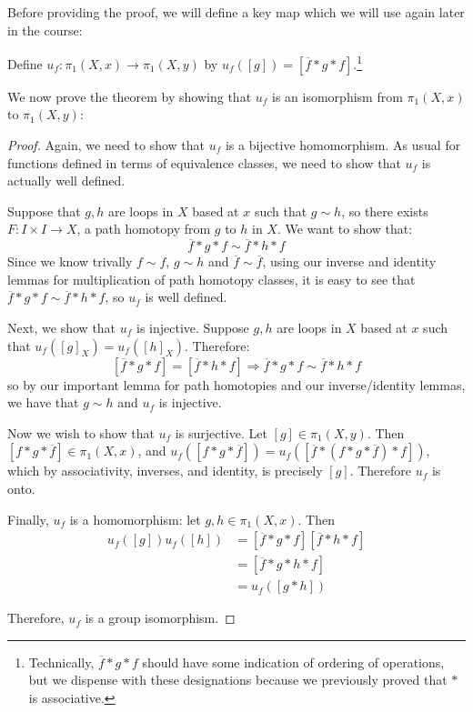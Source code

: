 Before providing the proof, we will define a key map which we will use again later in the course: 
\begin{definition}
	Define $u_f:\pi_1(X,x)\to \pi_1(X,y)$ by $u_f([g]) = [\overline{f}*g*f]$.\footnote{Technically, $\overline{f}*g*f$ should have some indication of ordering of operations, but we dispense with these designations because we previously proved that $*$ is associative.} 
\end{definition}
We now prove the theorem by showing that $u_f$ is an isomorphism from $\pi_1(X,x)$ to $\pi_1(X,y)$: 
\begin{proof}
	Again, we need to show that $u_f$ is a bijective homomorphism. As usual for functions defined in terms of equivalence classes, we need to show that $u_f$ is actually well defined. 
	
	Suppose that $g,h$ are loops in $X$ based at $x$ such that $g\sim h$, so there exists $F:I\times I\to X$, a path homotopy from $g$ to $h$ in $X$. We want to show that:
	\[\overline{f}*g*f \sim \overline{f}*h*f\]
	Since we know trivally $f\sim f$, $g\sim h$ and $\overline{f}\sim\overline{f}$, using our inverse and identity lemmas for multiplication of path homotopy classes, it is easy to see that $\overline{f}*g*f \sim \overline{f}*h*f$, so $u_f$ is well defined.
	
	Next, we show that $u_f$ is injective. Suppose $g,h$ are loops in $X$ based at $x$ such that $u_f([g]_X) = u_f([h]_X)$. Therefore:
	\[[\overline{f}*g*f] = [\overline{f}*h*f] \Rightarrow \overline{f}*g*f\sim \overline{f}*h*f\]
	so by our important lemma for path homotopies and our inverse/identity lemmas, we have that $g\sim h$ and $u_f$ is injective.
	
	Now we wish to show that $u_f$ is surjective. Let $[g]\in \pi_1(X,y)$. Then $[f*g*\overline{f}]\in \pi_1(X,x)$, and $u_f([f*g*\overline{f}])=u_f([\overline{f}*(f*g*\overline{f})*f])$, which by associativity, inverses, and identity, is precisely $[g]$. Therefore $u_f$ is onto.
	
	Finally, $u_f$ is a homomorphism: let $g,h\in \pi_1(X,x)$. Then 
	\begin{align*}
		u_f([g])u_f([h]) & = [\overline{f}*g*f][\overline{f}*h*f] \\
		& = [\overline{f}*g*h*f] \\
		&= u_f([g*h]) 
	\end{align*}
	
	Therefore, $u_f$ is a group isomorphism. 
\end{proof}


